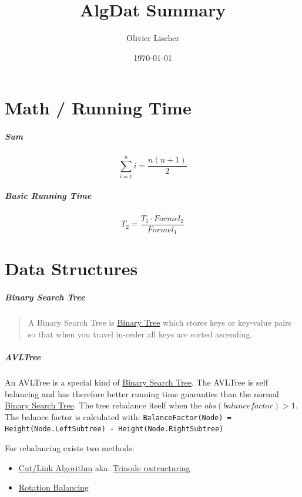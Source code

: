 \documentclass[11pt,twoside,twocolumn,landscape]{article}
\author{Olivier Lischer}
\date{\today}
\title{AlgDat Summary}
\begin{document}
\pagestyle{fancy}
\fancyhf{}
\fancyfoot[CE,CO]{\leftmark}
\fancyfoot[R]{\thepage}

\tableofcontents
\newpage


\section{Math / Running Time}
\label{sec:orgafdb592}
\subparagraph{Sum}
\label{sec:orge428551}

\begin{equation}
\sum_{i=1}^n i = \frac{n(n+1)}{2}
\end{equation}

\subparagraph{Basic Running Time}
\label{sec:org0056379}

\begin{equation}
  T_2 = \frac{T_1 \cdot Formel_2}{Formel_1}
\end{equation}
\section{Data Structures}
\label{sec:org62bee93}
\subparagraph{Binary Search Tree}
\label{sec:org244290e}
\begin{quote}
A Binary Search Tree is \href{../../../roam/20210806225200-binary_tree.org}{Binary Tree} which stores keys or key-value pairs so
that when you travel in-order all keys are sorted ascending.
\end{quote}

\subparagraph{AVLTree}
\label{sec:org2edc86e}

An AVLTree is a special kind of \href{../../../roam/20211008140953-binary_search_tree.org}{Binary Search Tree}.
The AVLTree is self balancing and has therefore better running time guaranties than the normal \href{../../../roam/20211008140953-binary_search_tree.org}{Binary Search Tree}.
The tree rebalance itself when the \(abs(balance factor) > 1\).
The balance factor is calculated with: \texttt{BalanceFactor(Node) = Height(Node.LeftSubtree) - Height(Node.RightSubtree)}


For rebalancing exists two methods:
\begin{itemize}
\item \href{../../../roam/20211008144714-cut_link_algorithm.org}{Cut/Link Algorithm} aka. \href{../../../roam/20211008144714-cut_link_algorithm.org}{Trinode restructuring}
\item \href{../../../roam/20211008145521-rotation_balancing.org}{Rotation Balancing}
\end{itemize}
\end{document}

